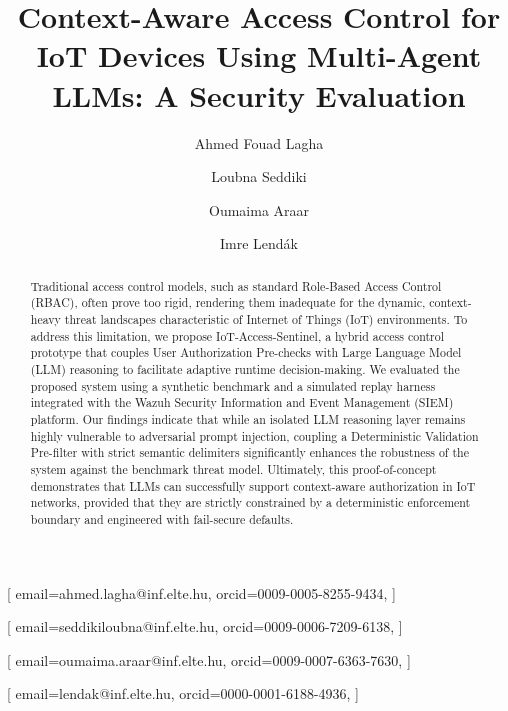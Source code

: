 \documentclass[
]{ceurart}
\begin{document}


\title{Context-Aware Access Control for IoT Devices Using Multi-Agent LLMs: A Security Evaluation}

\author[1]{Ahmed Fouad Lagha}[%
email=ahmed.lagha@inf.elte.hu,
orcid=0009-0005-8255-9434,
]
\cormark[1]
\author[1]{Loubna Seddiki}[%
email=seddikiloubna@inf.elte.hu,
orcid=0009-0006-7209-6138,
]
\author[1]{Oumaima Araar}[%
email=oumaima.araar@inf.elte.hu,
orcid=0009-0007-6363-7630,
]
\author[1]{Imre Lendák}[%
email=lendak@inf.elte.hu,
orcid=0000-0001-6188-4936,
]

\address[1]{Department of Data Science and Engineering, Eötvös Loránd University, Budapest, Hungary}


\begin{abstract}
    Traditional access control models, such as standard Role-Based Access Control (RBAC), often prove too rigid, rendering them inadequate for the dynamic, context-heavy threat landscapes characteristic of Internet of Things (IoT) environments. To address this limitation, we propose IoT-Access-Sentinel, a hybrid access control prototype that couples User Authorization Pre-checks with Large Language Model (LLM) reasoning to facilitate adaptive runtime decision-making. We evaluated the proposed system using a synthetic benchmark and a simulated replay harness integrated with the Wazuh Security Information and Event Management (SIEM) platform. Our findings indicate that while an isolated LLM reasoning layer remains highly vulnerable to adversarial prompt injection, coupling a Deterministic Validation Pre-filter with strict semantic delimiters significantly enhances the robustness of the system against the benchmark threat model. Ultimately, this proof-of-concept demonstrates that LLMs can successfully support context-aware authorization in IoT networks, provided that they are strictly constrained by a deterministic enforcement boundary and engineered with fail-secure defaults.
\end{abstract}
\end{document}
